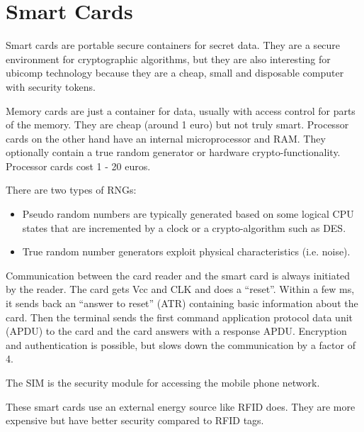 \section{Smart Cards}

\begin{mytitle} Smart cards are portable secure containers for secret data. They are a secure environment for cryptographic algorithms, but they are also interesting for ubicomp technology because they are a cheap, small and disposable computer with security tokens. 
\end{mytitle}
\begin{mytitle} Memory cards are just a container for data, usually with access control for parts of the memory. They are cheap (around 1 euro) but not truly smart. Processor cards on the other hand have an internal microprocessor and RAM. They optionally contain a true random generator or hardware crypto-functionality. Processor cards cost 1 - 20 euros.
\end{mytitle}

\begin{mytitle} There are two types of RNGs:
\begin{itemize}
    \item Pseudo random numbers are typically generated based on some logical CPU states that are incremented by a clock or a crypto-algorithm such as DES.
    \item True random number generators exploit physical characteristics (i.e. noise).
\end{itemize}
\end{mytitle}
\begin{mytitle} Communication between the card reader and the smart card is always initiated by the reader. The card gets Vcc and CLK and does a ``reset''. Within a few ms, it sends back an ``answer to reset'' (ATR) containing basic information about the card. Then the terminal sends the first command application protocol data unit (APDU) to the card and the card answers with a response APDU. Encryption and authentication is possible, but slows down the communication by a factor of 4.
\end{mytitle}
\begin{mytitle} The SIM is the security module for accessing the mobile phone network.
\end{mytitle}
\begin{mytitle} These smart cards use an external energy source like RFID does. They are more expensive but have better security compared to RFID tags.
\end{mytitle}
